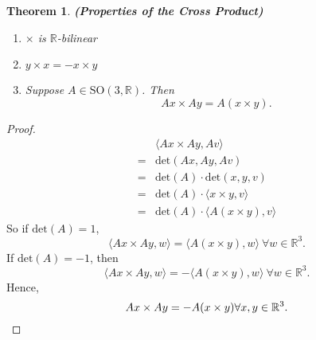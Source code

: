 \documentclass[prb,12pt]{revtex4-2}
\newtheorem{Theorem}{Theorem}
\theoremstyle{definition}
\theoremstyle{definition}
\newcommand{\R}{\mathbb{R}}
\begin{document}
\begin{Theorem}
	\textbf{(Properties of the Cross Product)}
	\begin{enumerate}
		\item $\times$ is $\R$-bilinear
		\item $y\times x = -x\times y$ 
		\item Suppose $A\in \text{SO}(3,\R)$. Then
			\[
			Ax\times Ay=A(x\times y)
			.\] 
	\end{enumerate}
\end{Theorem}
\begin{proof}
	\begin{align*}
		&\langle Ax\times Ay, Av\rangle\\
		=& \text{det}(Ax,Ay,Av)\\
		=& \text{det}(A)\cdot \text{det}(x,y,v)\\
		=&\text{det}(A)\cdot\langle x\times y, v\rangle\\
		=& \text{det}(A)\cdot \langle A(x\times y),v\rangle
	\end{align*}
	So if $\text{det}(A)=1$, 
	\[
	\langle Ax\times Ay,w\rangle=\langle A(x\times y), w\rangle~\forall w\in \R^3
	.\] 
	If $\text{det}(A)=-1$, then
	\[
	\langle Ax\times Ay,w\rangle = -\langle A(x\times y), w\rangle~\forall w\in \R^3
	.\] 
	Hence,
\[
Ax\times Ay=-A(x\times y)\forall x,y\in \R^3
.\qedhere\] 
\end{proof}
\end{document}
